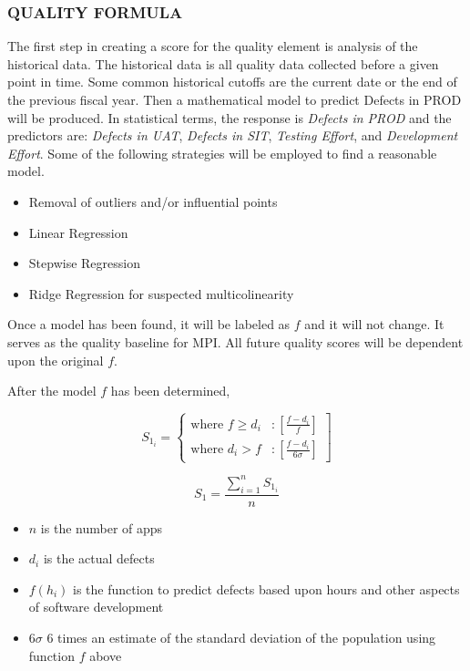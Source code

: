 \documentclass[SDSUThesis.tex]{subfiles}
\begin{document}
    \subsubsection{QUALITY FORMULA}
        The first step in creating a score for the quality
        element is analysis of the historical data.  The historical
        data is all quality data collected before  a given point
        in time.  Some common historical cutoffs are the current date
        or the end of the previous fiscal year.  Then a mathematical
        model to predict Defects in PROD will be produced.  In statistical
        terms, the response is \textit{Defects in PROD} and the predictors
        are: \textit{Defects in UAT}, \textit{Defects in SIT}, 
        \textit{Testing Effort}, and \textit{Development Effort}.  
        Some of the following strategies will be employed to find 
        a reasonable model.
        \begin{itemize}
            \item Removal of outliers and/or influential points
            \item Linear Regression
            \item Stepwise Regression
            \item Ridge Regression for suspected multicolinearity
        \end{itemize}
        
        Once a model has been found, it will be labeled as $f$ and it
        will not change.  It serves as the quality baseline for MPI. 
        All future quality scores will be dependent upon the original
        $f$.  
        
        After the model $f$ has been determined, 
        
        
        
    

\begin{displaymath}
   S_{1_i} = \left\{
     \begin{array}{lr}
       \text{where } f \geq d_i & : \left[ \frac{f - d_i}{f} \right] \\
       \text{where } d_i > f  & : \left[ \frac{f-d_i }{6\sigma} \right]
     \end{array}
   \right]
\end{displaymath} 

\[
    S_{1} = \frac{\sum^n_{i=1} S_{1_i}}{n}
\]
\begin{itemize}
\item $n$ is the number of apps
\item $d_i$ is the actual defects
\item $f(h_i)$ is the function to predict defects based upon hours and other aspects of software development
\item $6\sigma$ 6 times an estimate of the standard deviation of the population using function $f$ above
\end{itemize}
\end{document}
